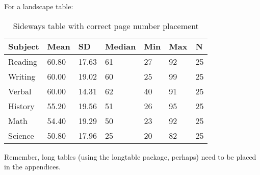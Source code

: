 For a landscape table:

\begin{sidewaystable}
	\begin{singlespace}
		\centering
\label{sampletable2}
\caption{Sideways table with correct page number placement}
\begin{tabular}{lllllll} \toprule
	Subject & Mean  & SD    & Median & Min & Max & N  \\ \midrule
	Reading & 60.80 & 17.63 & 61     & 27  & 92  & 25 \\
	Writing & 60.00 & 19.02 & 60     & 25  & 99  & 25 \\
	Verbal  & 60.00 & 14.31 & 62     & 40  & 91  & 25 \\
	History & 55.20 & 19.56 & 51     & 26  & 95  & 25 \\
	Math    & 54.40 & 19.29 & 50     & 23  & 92  & 25 \\
	Science & 50.80 & 17.96 & 25     & 20  & 82  & 25 \\
	\bottomrule
	\end{tabular}
	\end{singlespace}
\end{sidewaystable}


Remember, long tables (using the \textsf{longtable} package, perhaps) need to be placed in the appendices. 